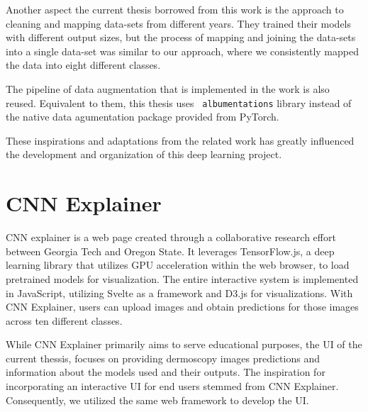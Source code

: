 Another aspect the current thesis borrowed from this work is the approach to
cleaning and mapping data-sets from different years. They trained their models
with different output sizes, but the process of mapping and joining the
data-sets into a single data-set was similar to our approach, where we
consistently mapped the data into eight different classes. \newline

The pipeline of data augmentation that is implemented in the work is also
reused. Equivalent to them, this thesis uses {\tt
albumentations}\cite{Albumentations} library instead of the native data
agumentation package provided from PyTorch. \newline

These inspirations and adaptations from the related work has greatly influenced
the development and organization of this deep learning project.

\section{CNN Explainer}

CNN explainer is a web page created through a collaborative research effort
between Georgia Tech and Oregon State\cite{CNNExplainer}. It leverages
TensorFlow.js, a deep learning library that utilizes GPU acceleration within
the web browser, to load pretrained models for visualization. The entire
interactive system is implemented in JavaScript, utilizing Svelte as a
framework and D3.js for visualizations. With CNN Explainer, users can upload
images and obtain predictions for those images across ten different classes.
\newline

While CNN Explainer primarily aims to serve educational purposes, the UI of the
current thessis, focuses on providing dermoscopy images predictions and
information about the models used and their outputs. The inspiration for
incorporating an interactive UI for end users stemmed from CNN Explainer.
Consequently, we utilized the same web framework to develop the UI.
